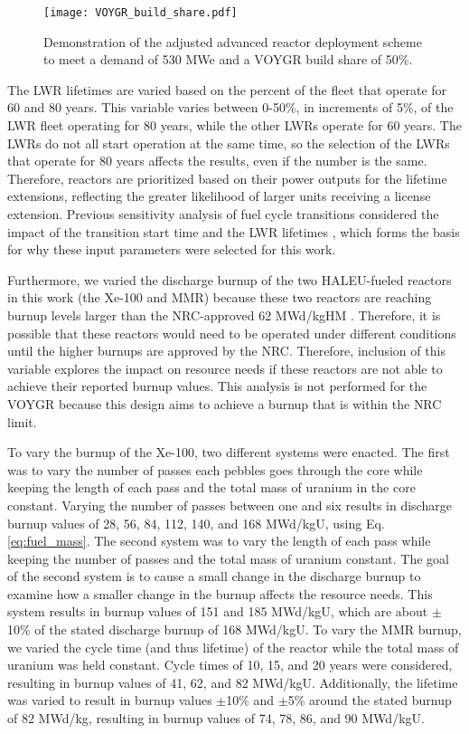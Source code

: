\begin{figure}
    \centering 
    \texttt{[image: VOYGR\_build\_share.pdf]}
    \caption{Demonstration of the adjusted advanced reactor deployment 
    scheme to meet a demand of 530 MWe and a VOYGR build share of 
    50\%.}
    \label{fig:build-share-deploy}
\end{figure}

The \gls{LWR} lifetimes are varied based 
on the percent of the fleet that operate for 60 and 80 years. This 
variable varies between 0-50\%, in increments of 5\%, of the \gls{LWR} 
fleet operating for 80 
years, while the other \glspl{LWR} operate for 60 years. The 
\glspl{LWR} do not all start operation at the same time, so the 
selection of the \glspl{LWR} that operate for 80 years affects the results, 
even if the number is the same. Therefore, reactors are prioritized based 
on their power outputs for the lifetime extensions, reflecting the greater likelihood of 
larger units receiving a license extension. Previous sensitivity analysis of 
fuel cycle transitions considered the impact of the transition start time 
and the \gls{LWR} lifetimes \cite{chee_sensitivity_2019,feng_sensitivity_2020},
which forms the basis for why these input parameters were selected for this 
work.

Furthermore, we varied the discharge burnup of the two \gls{HALEU}-fueled 
reactors in this work (the Xe-100 and \gls{MMR}) because these two reactors 
are reaching burnup levels larger than the \gls{NRC}-approved 62 MWd/kgHM 
\cite{noauthor_higher_2023}. Therefore, it is possible that these 
reactors would need to be operated under different conditions until the 
higher burnups are approved by the \gls{NRC}.
Therefore, inclusion of this variable explores the impact 
on resource needs if these reactors are not able to achieve their 
reported burnup values. This analysis is not performed for the VOYGR because this 
design aims to achieve a burnup that is within the \gls{NRC} limit. 

To vary the burnup of the Xe-100, two different systems were enacted. The 
first was to vary the number of passes each pebbles goes through the core
while keeping the length of each pass and the total mass of uranium 
in the core constant. Varying the number of passes between one and six 
results in discharge burnup values of 28, 56, 84, 112, 140, and 168 MWd/kgU, 
using Eq. \ref{eq:fuel_mass}. The second system was to vary the length 
of each pass while keeping the number of passes and the total mass of uranium 
constant. The goal of the second system is to cause a small change in the 
discharge burnup to examine how a smaller change in the burnup affects 
the resource needs. This system results in burnup values of 151 and 185 MWd/kgU, 
which are about $\pm$10\% of the stated discharge burnup of 168 MWd/kgU. 
To vary the \gls{MMR} burnup, we varied the cycle time (and thus lifetime) of 
the reactor while the total mass of uranium was held constant. 
Cycle times of 10, 15, and 20 years were considered, resulting in burnup 
values of 41, 62, and 82 MWd/kgU. Additionally, the lifetime was varied to 
result in burnup values $\pm$10\% and $\pm$5\% around the stated burnup of 
82 MWd/kg, resulting in burnup values of 74, 78, 86, and 90 MWd/kgU. 

